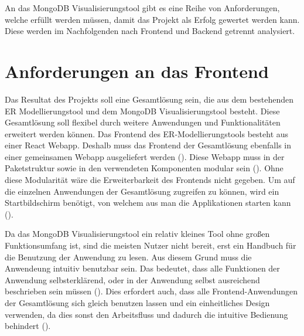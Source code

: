 \iffalse
Die Analyse des zu lösenden Problems ist Grundlage für jedes 
ingenieurmäßige Vorgehen. Daher soll in diesem Kapitel das zu lösenden 
Problem auf Basis des im Grundlagenkapitel aufbereiteten Wissens 
analysiert werden. Hierzu ist insbesondere notwendig zu klären, wie sich 
das Gesamtproblem in Teilprobleme zerlegen lässt und welche 
Abhängigkeiten zwischen diesen bestehen.

Bei Software-Projekten befindet sich an dieser Stelle typischerweise die 
Anforderungsanalyse des \ac{rup}.

Anforderungen:
\begin{itemize}
    \item modular
    \item erweiterbar
    \item performant
\end{itemize}

\fi

An das MongoDB Visualisierungstool gibt es eine Reihe von Anforderungen, welche erfüllt werden müssen, damit das Projekt als Erfolg gewertet werden kann.
Diese werden im Nachfolgenden nach Frontend und Backend getrennt analysiert.

\section{Anforderungen an das Frontend}
\label{sec:anf_frontend}

Das Resultat des Projekts soll eine Gesamtlösung sein, die aus dem bestehenden ER Modellierungstool und dem MongoDB Visualisierungstool besteht. 
Diese Gesamtlösung soll flexibel durch weitere Anwendungen und Funktionalitäten erweitert werden können.
Das Frontend des ER-Modellierungstools besteht aus einer React Webapp.
Deshalb muss das Frontend der Gesamtlösung ebenfalls in einer gemeinsamen Webapp ausgeliefert werden ().
Diese Webapp muss in der Paketstruktur sowie in den verwendeten Komponenten modular sein ().
Ohne diese Modularität wäre die Erweiterbarkeit des Frontends nicht gegeben.
Um auf die einzelnen Anwendungen der Gesamtlösung zugreifen zu können, wird ein Startbildschirm benötigt, von welchem aus man die Applikationen starten kann (). 

Da das MongoDB Visualisierungstool ein relativ kleines Tool ohne großen Funktionsumfang ist, sind die meisten Nutzer nicht bereit, erst ein Handbuch für die Benutzung der Anwendung zu lesen.
Aus diesem Grund muss die Anwendeung intuitiv benutzbar sein.
Das bedeutet, dass alle Funktionen der Anwendung selbsterklärend, oder in der Anwendung selbst ausreichend beschrieben sein müssen ().
Dies erfordert auch, dass alle Frontend-Anwendungen der Gesamtlösung sich gleich benutzen lassen und ein einheitliches Design verwenden, da dies sonst den Arbeitsfluss und dadurch die intuitive Bedienung behindert ().


